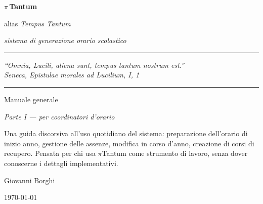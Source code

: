 



\begin{titlepage}
\thispagestyle{empty}
\centering
\vspace*{1.4cm}

{\Huge\bfseries $\pi$\,Tantum\par}
\vspace{0.2cm}
{\Large alias \emph{Tempus Tantum}\par}
\vspace{0.4cm}
{\Large\itshape sistema di generazione orario scolastico\par}

\vspace{1.0cm}
\rule{0.5\textwidth}{0.4pt}

\vspace{0.8cm}
\begin{minipage}{0.85\textwidth}
\centering
\itshape
``Omnia, Lucili, aliena sunt, tempus tantum nostrum est.''\\
\upshape\small Seneca, \emph{Epistulae morales ad Lucilium}, I, 1
\end{minipage}

\vspace{1.0cm}
\rule{0.5\textwidth}{0.4pt}

\vspace{1.4cm}
{\LARGE Manuale generale\par}
\vspace{0.4cm}
{\Large\itshape Parte I --- per coordinatori d'orario\par}

\vspace{2cm}

\begin{minipage}{0.8\textwidth}
\centering\small
Una guida discorsiva all'uso quotidiano del sistema:
preparazione dell'orario di inizio anno, gestione delle assenze,
modifica in corso d'anno, creazione di corsi di recupero.
Pensata per chi usa $\pi$Tantum come strumento di lavoro,
senza dover conoscerne i dettagli implementativi.
\end{minipage}

\vfill

{\large Giovanni Borghi\par}
\vspace{0.2cm}
{\large \today\par}
\end{titlepage}

